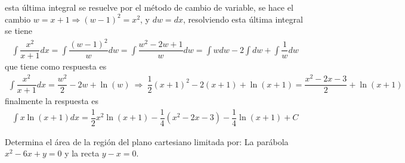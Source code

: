 \documentclass[legalpaper, 12pt]{exam}
\begin{document}
\begin{questions}
\begin{solution}
\begin{itemize}
esta última integral se resuelve por el método de cambio de variable, se hace el cambio $w = x+1\Rightarrow\left(w-1\right)^2 = x^2$, y $dw = dx$, resolviendo esta última integral se tiene
\begin{align*}
\int \dfrac{x^2}{x+1} dx = \int \dfrac{\left(w-1\right)^2}{w} dw = \int\dfrac{w^2 - 2w + 1}{w} dw = \int wdw - 2\int dw + \int \dfrac{1}{w} dw
\end{align*}
que tiene como respuesta es
\begin{align*}
\int \dfrac{x^2}{x+1} dx = \dfrac{w^2}{2} - 2w + \ln{(w)}\ \Rightarrow\ \dfrac{1}{2}\left(x+1\right)^2 - 2\left(x+1\right) + \ln{(x+1)} = \dfrac{x^2 - 2x - 3}{2} + \ln{(x+1)}
\end{align*}
finalmente la respuesta es
\begin{align}
\int x\ln{(x+1)}dx = \dfrac{1}{2}x^2\ln{(x+1)} - \dfrac{1}{4}\left(x^2 - 2x - 3\right) - \dfrac{1}{4}\ln{(x+1)} + C
\end{align}
 \end{itemize}
 \end{solution}
\question Determina el área de la región del plano cartesiano limitada por: La parábola $x^2 - 6x + y = 0$ y la recta $y - x = 0$.
\end{questions}
\vspace{0.15in}
\end{document}
